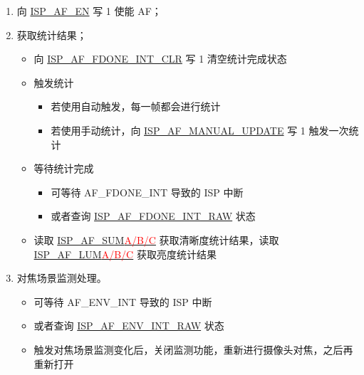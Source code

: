 \documentclass[main\_\_CN.tex]{subfiles}
\begin{document}
\begin{enumerate}
    \item 向 \hyperref[fielddesc:ISPAFEN]{ISP\_AF\_EN} 写 1 使能 AF；

    \item 获取统计结果；
    \begin{itemize}
        \item 向 \hyperref[fielddesc:ISPAFFDONEINTCLR]{ISP\_AF\_FDONE\_INT\_CLR} 写 1 清空统计完成状态
        \item 触发统计
        \begin{itemize}
            \item 若使用自动触发，每一帧都会进行统计
            \item 若使用手动统计，向 \hyperref[fielddesc:ISPAFMANUALUPDATE]{ISP\_AF\_MANUAL\_UPDATE} 写 1 触发一次统计
        \end{itemize}
        \item 等待统计完成
        \begin{itemize}
            \item 可等待 AF\_FDONE\_INT 导致的 ISP 中断
            \item 或者查询 \hyperref[fielddesc:ISPAFFDONEINTRAW]{ISP\_AF\_FDONE\_INT\_RAW} 状态
        \end{itemize}
        \item 读取 \hyperref[fielddesc:ISPAFSUMA]{ISP\_AF\_SUM\textcolor{red}{A/B/C}} 获取清晰度统计结果，读取 \hyperref[fielddesc:ISPAFLUMA]{ISP\_AF\_LUM\textcolor{red}{A/B/C}} 获取亮度统计结果
    \end{itemize}

    \item 对焦场景监测处理。
    \begin{itemize}
        \item 可等待 AF\_ENV\_INT 导致的 ISP 中断
        \item 或者查询 \hyperref[fielddesc:ISPAFENVINTRAW]{ISP\_AF\_ENV\_INT\_RAW} 状态
        \item 触发对焦场景监测变化后，关闭监测功能，重新进行摄像头对焦，之后再重新打开
    \end{itemize}
\end{enumerate}
\end{document}
